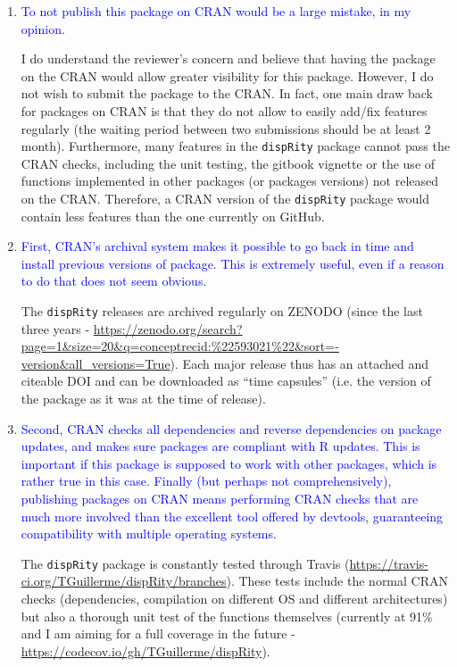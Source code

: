 \documentclass[12pt,letterpaper]{article}
\begin{document}
\begin{enumerate}

\item{\textcolor{blue}{To not publish this package on CRAN would be a large mistake, in my opinion.}}

I do understand the reviewer's concern and believe that having the package on the CRAN would allow greater visibility for this package.
However, I do not wish to submit the package to the CRAN.
In fact, one main draw back for packages on CRAN is that they do not allow to easily add/fix features regularly (the waiting period between two submissions should be at least 2 month).
Furthermore, many features in the \texttt{dispRity} package cannot pass the CRAN checks, including the unit testing, the gitbook vignette or the use of functions implemented in other packages (or packages versions) not released on the CRAN.
Therefore, a CRAN version of the \texttt{dispRity} package would contain less features than the one currently on GitHub.

\item{\textcolor{blue}{First, CRAN's archival system makes it possible to go back in time and install previous versions of package. This is extremely useful, even if a reason to do that does not seem obvious.}}

The \texttt{dispRity} releases are archived regularly on ZENODO (since the last three years - \url{https://zenodo.org/search?page=1&size=20&q=conceptrecid:%22593021%22&sort=-version&all_versions=True}).
Each major release thus has an attached and citeable DOI and can be downloaded as ``time capsules'' (i.e. the version of the package as it was at the time of release).

\item{\textcolor{blue}{Second, CRAN checks all dependencies and reverse dependencies on package updates, and makes sure packages are compliant with R updates. This is important if this package is supposed to work with other packages, which is rather true in this case. Finally (but perhaps not comprehensively), publishing packages on CRAN means performing CRAN checks that are much more involved than the excellent tool offered by devtools, guaranteeing compatibility with multiple operating systems.}}

The \texttt{dispRity} package is constantly tested through Travis (\url{https://travis-ci.org/TGuillerme/dispRity/branches}).
These tests include the normal CRAN checks (dependencies, compilation on different OS and different architectures) but also a thorough unit test of the functions themselves (currently at 91\% and I am aiming for a full coverage in the future - \url{https://codecov.io/gh/TGuillerme/dispRity}).


\end{enumerate}
\end{document}
